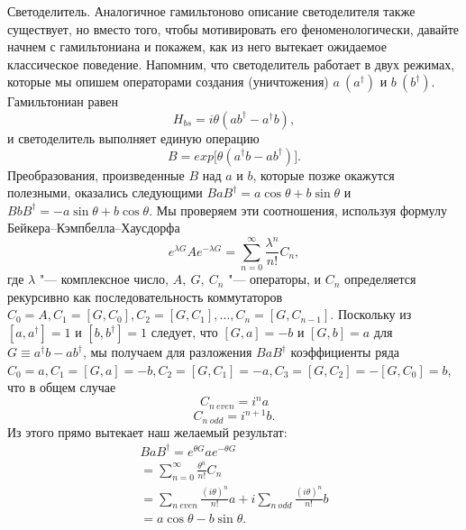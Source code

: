 \begin{multicols}{2}
{        Светоделитель. Аналогичное гамильтоново описание светоделителя также существует, но
        вместо того, чтобы мотивировать его феноменологически, давайте начнем с гамильтониана и покажем, как из него вытекает ожидаемое классическое поведение.
        Напомним, что светоделитель работает в двух режимах, которые мы опишем операторами создания (уничтожения) $a~(a^{\dagger})$ и $b~(b^{\dagger})$. Гамильтониан равен 
        \begin{equation}
            H_{bs}=i\theta(ab^{\dagger}-a^{\dagger}b),
        \end{equation}
        и светоделитель выполняет единую операцию
        \begin{equation}
            B=exp\big[\theta(a^{\dagger}b-ab^{\dagger})\big].
        \end{equation}
        Преобразования, произведенные $B$ над $a$ и $b$, которые позже окажутся полезными, оказались следующими 
        $BaB^{\dagger}=a\cos{\theta}+b\sin{\theta}$ и $BbB^{\dagger}=-a\sin{\theta}+b\cos{\theta}$.
        Мы проверяем эти соотношения, используя формулу Бейкера–Кэмпбелла–Хаусдорфа
        \begin{equation}
            e^{\lambda G}Ae^{-\lambda G}=\sum_{n = 0}^{\infty}  \frac{\lambda^n}{n!}C_n,
        \end{equation}
        где $\lambda$ "--- комплексное число, $A,~G,~C_n$ "--- операторы, и $C_n$ определяется рекурсивно как последовательность коммутаторов 
        $C_0=A,C_1=[G,C_0],C_2=[G,C_1],\ldots,C_n=[G,C_{n-1}].$ Поскольку из $[a,a^{\dagger}] = 1$ и $[b,b^{\dagger}]=1$ следует, что $[G,a]=-b$ и $[G,b]=a$ 
        для $G\equiv a^{\dagger}b-ab^{\dagger}$, мы получаем для разложения $BaB^{\dagger}$ коэффициенты ряда $C_0=a,C_1=[G,a]=-b,C_2=[G,C_1]=-a,C_3=[G,C_2]=-[G,C_0]=b$, что в общем случае 
        \begin{equation}
            C_{n~even} = i^na
        \end{equation}
        \begin{equation}
            C_{n~odd} = i^{n+1}b.
        \end{equation}
        Из этого прямо вытекает наш желаемый результат:
        \begin{equation}
            \begin{split}
                BaB^{\dagger}=e^{\theta G}ae^{-\theta G} \\
                = \sum_{n = 0}^{\infty} \frac{\theta^n}{n!}C_n \\
                = \sum_{n~even}^{}  \frac{(i\theta)^n}{n!}a+i \sum_{n~odd}^{} \frac{(i\theta)^n}{n!}b \\
                = a \cos{\theta} - b \sin{\theta}.
            \end{split}
        \end{equation}


}
\end{multicols}
